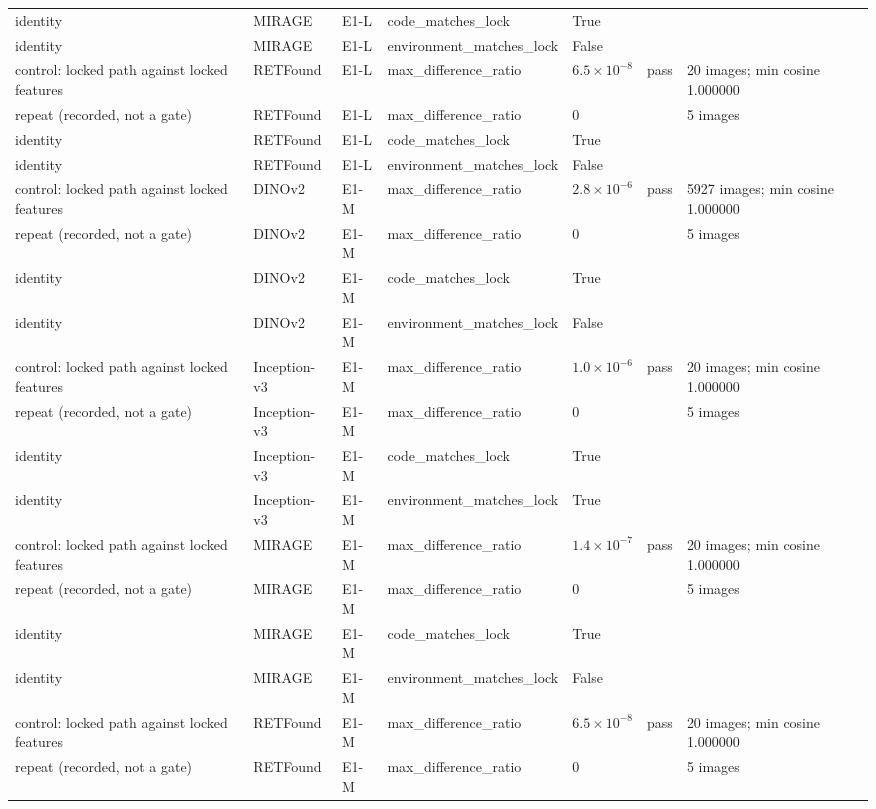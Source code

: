 \begin{longtable}{@{}p{3.3cm}lp{1.5cm}p{3.6cm}p{2.2cm}p{1.6cm}p{3.2cm}@{}}
identity & MIRAGE & E1-L & code\_matches\_lock & True &  &  \\
identity & MIRAGE & E1-L & environment\_matches\_lock & False &  &  \\
control: locked path against locked features & RETFound & E1-L & max\_difference\_ratio & $6.5\times10^{-8}$ & pass & 20 images; min cosine 1.000000 \\
repeat (recorded, not a gate) & RETFound & E1-L & max\_difference\_ratio & 0 &  & 5 images \\
identity & RETFound & E1-L & code\_matches\_lock & True &  &  \\
identity & RETFound & E1-L & environment\_matches\_lock & False &  &  \\
control: locked path against locked features & DINOv2 & E1-M & max\_difference\_ratio & $2.8\times10^{-6}$ & pass & 5927 images; min cosine 1.000000 \\
repeat (recorded, not a gate) & DINOv2 & E1-M & max\_difference\_ratio & 0 &  & 5 images \\
identity & DINOv2 & E1-M & code\_matches\_lock & True &  &  \\
identity & DINOv2 & E1-M & environment\_matches\_lock & False &  &  \\
control: locked path against locked features & Inception-v3 & E1-M & max\_difference\_ratio & $1.0\times10^{-6}$ & pass & 20 images; min cosine 1.000000 \\
repeat (recorded, not a gate) & Inception-v3 & E1-M & max\_difference\_ratio & 0 &  & 5 images \\
identity & Inception-v3 & E1-M & code\_matches\_lock & True &  &  \\
identity & Inception-v3 & E1-M & environment\_matches\_lock & True &  &  \\
control: locked path against locked features & MIRAGE & E1-M & max\_difference\_ratio & $1.4\times10^{-7}$ & pass & 20 images; min cosine 1.000000 \\
repeat (recorded, not a gate) & MIRAGE & E1-M & max\_difference\_ratio & 0 &  & 5 images \\
identity & MIRAGE & E1-M & code\_matches\_lock & True &  &  \\
identity & MIRAGE & E1-M & environment\_matches\_lock & False &  &  \\
control: locked path against locked features & RETFound & E1-M & max\_difference\_ratio & $6.5\times10^{-8}$ & pass & 20 images; min cosine 1.000000 \\
repeat (recorded, not a gate) & RETFound & E1-M & max\_difference\_ratio & 0 &  & 5 images \\

\end{longtable}
